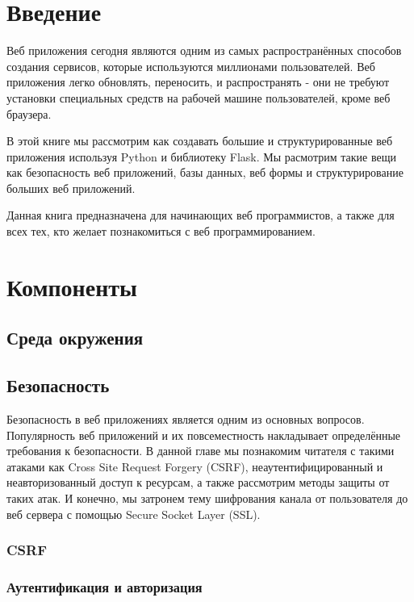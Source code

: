 \chapter*{Введение}
Веб приложения сегодня являются одним из самых распространённых
способов создания сервисов, которые используются миллионами 
пользователей. Веб приложения легко обновлять, переносить, и 
распространять - они не требуют установки специальных средств 
на рабочей машине пользователей, кроме веб браузера.

В этой книге мы рассмотрим как создавать большие и структурированные
веб приложения используя Python и библиотеку Flask. Мы расмотрим
такие вещи как безопасность веб приложений, базы данных, веб формы
и структурирование больших веб приложений.

Данная книга предназначена для начинающих веб программистов, а также
для всех тех, кто желает познакомиться с веб программированием.

\chapter{Компоненты}

\section{Среда окружения}

\section{Безопасность}

Безопасность в веб приложениях является одним из основных
вопросов. Популярность веб приложений и их повсеместность 
накладывает определённые требования к безопасности. В данной
главе мы познакомим читателя с такими атаками как Cross
Site Request Forgery (CSRF), неаутентифицированный и неавторизованный
доступ к ресурсам, а также рассмотрим методы защиты от таких атак. 
И конечно, мы затронем тему шифрования канала от пользователя до веб 
сервера с помощью Secure Socket Layer (SSL).

\subsection{CSRF}

\subsection{Аутентификация и авторизация}


